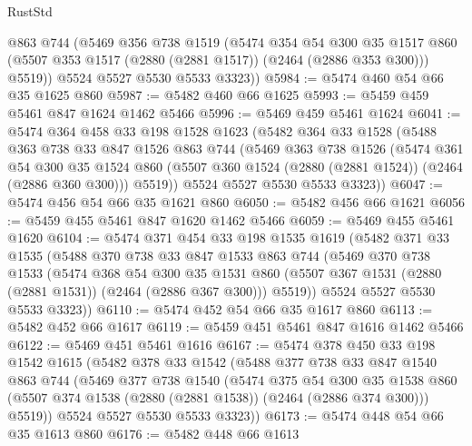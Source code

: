 \begin{lexlean}{RustStd}
\begin{coremodule}
        @863
        @744
        (@5469
          @356
          @738
          @1519
          (@5474
            @354
            @54
            @300
            @35
            @1517
            @860
            (@5507 @353 @1517 (@2880 (@2881 @1517)) (@2464 (@2886 @353 @300)))
            @5519))
        @5524
        @5527
        @5530
        @5533
        @3323))
@5984 := @5474 @460 @54 @66 @35 @1625 @860
@5987 := @5482 @460 @66 @1625
@5993 := @5459 @459 @5461 @847 @1624 @1462 @5466
@5996 := @5469 @459 @5461 @1624
@6041 := @5474
    @364
    @458
    @33
    @198
    @1528
    @1623
    (@5482
      @364
      @33
      @1528
      (@5488
        @363
        @738
        @33
        @847
        @1526
        @863
        @744
        (@5469
          @363
          @738
          @1526
          (@5474
            @361
            @54
            @300
            @35
            @1524
            @860
            (@5507 @360 @1524 (@2880 (@2881 @1524)) (@2464 (@2886 @360 @300)))
            @5519))
        @5524
        @5527
        @5530
        @5533
        @3323))
@6047 := @5474 @456 @54 @66 @35 @1621 @860
@6050 := @5482 @456 @66 @1621
@6056 := @5459 @455 @5461 @847 @1620 @1462 @5466
@6059 := @5469 @455 @5461 @1620
@6104 := @5474
    @371
    @454
    @33
    @198
    @1535
    @1619
    (@5482
      @371
      @33
      @1535
      (@5488
        @370
        @738
        @33
        @847
        @1533
        @863
        @744
        (@5469
          @370
          @738
          @1533
          (@5474
            @368
            @54
            @300
            @35
            @1531
            @860
            (@5507 @367 @1531 (@2880 (@2881 @1531)) (@2464 (@2886 @367 @300)))
            @5519))
        @5524
        @5527
        @5530
        @5533
        @3323))
@6110 := @5474 @452 @54 @66 @35 @1617 @860
@6113 := @5482 @452 @66 @1617
@6119 := @5459 @451 @5461 @847 @1616 @1462 @5466
@6122 := @5469 @451 @5461 @1616
@6167 := @5474
    @378
    @450
    @33
    @198
    @1542
    @1615
    (@5482
      @378
      @33
      @1542
      (@5488
        @377
        @738
        @33
        @847
        @1540
        @863
        @744
        (@5469
          @377
          @738
          @1540
          (@5474
            @375
            @54
            @300
            @35
            @1538
            @860
            (@5507 @374 @1538 (@2880 (@2881 @1538)) (@2464 (@2886 @374 @300)))
            @5519))
        @5524
        @5527
        @5530
        @5533
        @3323))
@6173 := @5474 @448 @54 @66 @35 @1613 @860
@6176 := @5482 @448 @66 @1613

\end{coremodule}
\end{lexlean}
